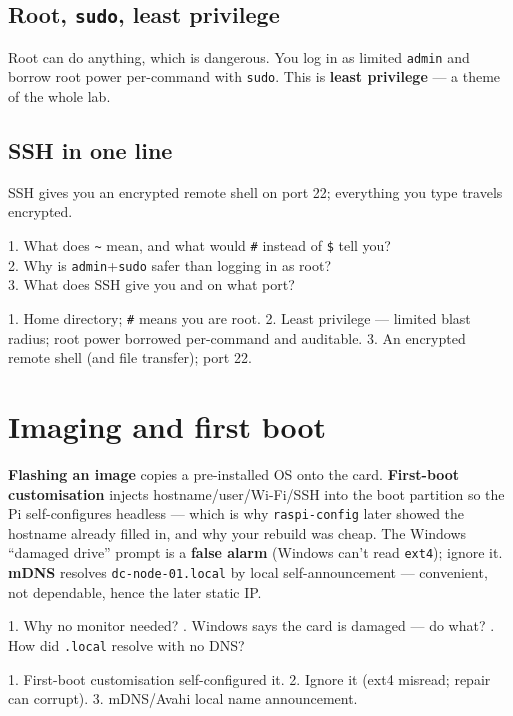 \documentclass[11pt,a4paper]{article}
\begin{document}
\subsection{Root, \texttt{sudo}, least privilege}
Root can do anything, which is dangerous. You log in as limited \texttt{admin}
and borrow root power per-command with \texttt{sudo}. This is \textbf{least
privilege} — a theme of the whole lab.

\subsection{SSH in one line}
SSH gives you an encrypted remote shell on port 22; everything you type travels
encrypted.

\begin{skillq}
1. What does \texttt{\~{}} mean, and what would \texttt{\#} instead of \texttt{\$} tell you?\\
2. Why is \texttt{admin}+\texttt{sudo} safer than logging in as root?\\
3. What does SSH give you and on what port?
\end{skillq}
\begin{skilla}
1. Home directory; \texttt{\#} means you are root.
2. Least privilege — limited blast radius; root power borrowed per-command and auditable.
3. An encrypted remote shell (and file transfer); port 22.
\end{skilla}

\section{Imaging and first boot}
\textbf{Flashing an image} copies a pre-installed OS onto the card.
\textbf{First-boot customisation} injects hostname/user/Wi-Fi/SSH into the boot
partition so the Pi self-configures headless — which is why \texttt{raspi-config}
later showed the hostname already filled in, and why your rebuild was cheap.
The Windows ``damaged drive'' prompt is a \textbf{false alarm} (Windows can't
read \texttt{ext4}); ignore it. \textbf{mDNS} resolves \texttt{dc-node-01.local}
by local self-announcement — convenient, not dependable, hence the later static
IP.

\begin{skillq}
1. Why no monitor needed? . Windows says the card is damaged — do what? . How did \texttt{.local} resolve with no DNS?
\end{skillq}
\begin{skilla}
1. First-boot customisation self-configured it. 2. Ignore it (ext4 misread; repair can corrupt). 3. mDNS/Avahi local name announcement.
\end{skilla}
\end{document}
